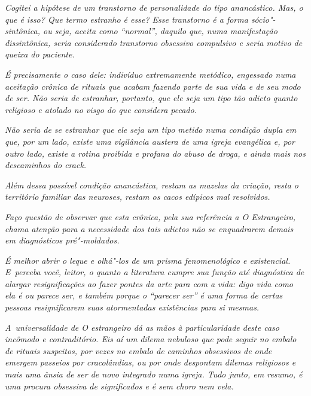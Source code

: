 \emph{Cogitei a hipótese de um transtorno de personalidade do tipo
anancástico. Mas, o que é isso? Que termo estranho é esse? Esse
transtorno é a forma sócio"-sintônica, ou seja, aceita como ``normal'',
daquilo que, numa manifestação dissintônica, seria considerado
transtorno obsessivo compulsivo e seria motivo de queixa do paciente.}~

\emph{É precisamente o caso dele: indivíduo extremamente metódico,
engessado numa aceitação crônica de rituais que acabam fazendo parte de
sua vida e de seu modo de ser. Não seria de estranhar, portanto, que ele
seja um tipo tão adicto quanto religioso e atolado no visgo do que
considera pecado.}

\emph{Não seria de se estranhar que ele seja um tipo metido numa
condição dupla em que, por um lado, existe uma vigilância austera de uma
igreja evangélica e, por outro lado, existe a rotina proibida e profana
do abuso de droga, e ainda mais nos descaminhos do crack.}~

\emph{Além dessa possível condição anancástica, restam as mazelas da
criação, resta o território familiar das neuroses, restam os cacos
edípicos mal resolvidos.}~

\emph{Faço questão de observar que esta crônica, pela sua referência a O
Estrangeiro, chama atenção para a necessidade dos tais adictos não se
enquadrarem demais em diagnósticos pré"-moldados.}~

\emph{É melhor abrir o leque e olhá"-los de um prisma fenomenológico e
existencial. E~perceba você, leitor, o quanto a literatura cumpre sua
função até diagnóstica de alargar resignificações ao fazer pontes da
arte para com a vida: digo vida como ela é ou parece ser, e também
porque o ``parecer ser'' é uma forma de certas pessoas resignificarem
suas atormentadas existências para si mesmas.}~

\emph{A~universalidade de O estrangeiro dá as mãos à particularidade
deste caso incômodo e contraditório. Eis aí um dilema nebuloso que pode
seguir no embalo de rituais suspeitos, por vezes no embalo de caminhos
obsessivos de onde emergem passeios por cracolândias, ou por onde
despontam dilemas religiosos e mais uma ânsia de ser de novo integrado
numa igreja. Tudo junto, em resumo, é uma procura obsessiva de
significados e é sem choro nem vela.~}

